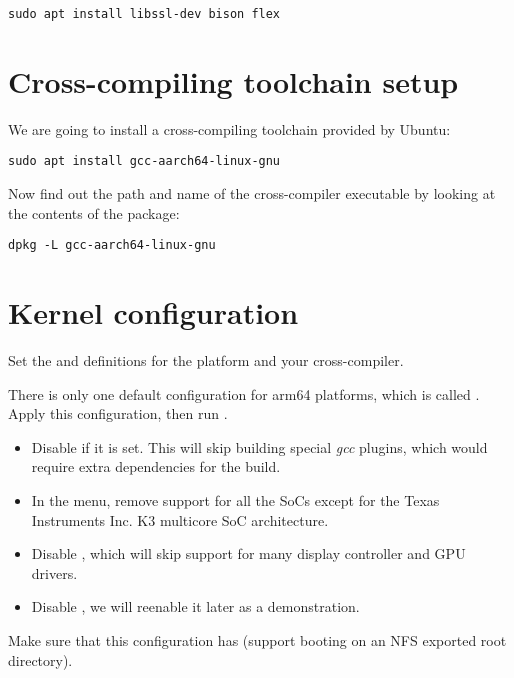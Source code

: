 \begin{verbatim}
sudo apt install libssl-dev bison flex
\end{verbatim}

\section{Cross-compiling toolchain setup}

We are going to install a cross-compiling toolchain provided by Ubuntu:

\begin{verbatim}
sudo apt install gcc-aarch64-linux-gnu
\end{verbatim}

Now find out the path and name of the cross-compiler executable by looking at the contents of the package:

\begin{verbatim}
dpkg -L gcc-aarch64-linux-gnu
\end{verbatim}

\section{Kernel configuration}

Set the  and  definitions for the 
platform and your cross-compiler.

There is only one default configuration for arm64 platforms, which is called
. Apply this configuration, then run .

\begin{itemize}
\item Disable  if it is set. This will skip
  building special {\em gcc} plugins, which would require extra dependencies
  for the build.
\item In the  menu, remove support for all the SoCs except
for the Texas Instruments Inc. K3 multicore SoC architecture.
\item Disable , which will skip support for many display
controller and GPU drivers.
\item Disable , we will reenable it later as a demonstration.
\end{itemize}

Make sure that this configuration has  (support
booting on an NFS exported root directory).

